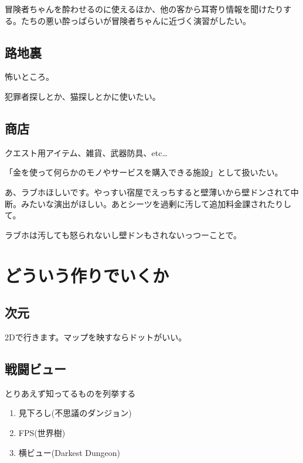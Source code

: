 \documentclass{mynote}
\begin{document}
冒険者ちゃんを酔わせるのに使えるほか、他の客から耳寄り情報を聞けたりする。たちの悪い酔っぱらいが冒険者ちゃんに近づく演習がしたい。

\subsection{路地裏}
怖いところ。

犯罪者探しとか、猫探しとかに使いたい。

\subsection{商店}
クエスト用アイテム、雑貨、武器防具、etc\dots

「金を使って何らかのモノやサービスを購入できる施設」として扱いたい。

あ、ラブホほしいです。やっすい宿屋でえっちすると壁薄いから壁ドンされて中断。みたいな演出がほしい。あとシーツを過剰に汚して追加料金課されたりして。

ラブホは汚しても怒られないし壁ドンもされないっつーことで。

\section{どういう作りでいくか}
\subsection{次元}
2Dで行きます。マップを映すならドットがいい。

\subsection{戦闘ビュー}
とりあえず知ってるものを列挙する

\begin{enumerate}
  \item 見下ろし(不思議のダンジョン)
  \item FPS(世界樹)
  \item 横ビュー(Darkest Dungeon)
\end{enumerate}
\end{document}
